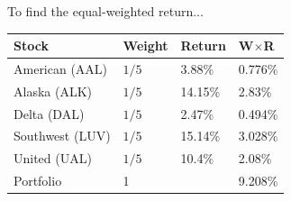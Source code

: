 To find the equal-weighted return...
\begin{center}
	{\color{blue}
	\begin{tabular}{l|lll}
		\textbf{Stock} & \textbf{W}eight & \textbf{R}eturn & \textbf{W}$\times$\textbf{R}\\ \hline
		American (AAL) & $1/5$ & 3.88\% & 0.776\% \\
		Alaska (ALK) & $1/5$ & 14.15\% & 2.83\% \\
		Delta (DAL) & $1/5$ & 2.47\% & 0.494\% \\
		Southwest (LUV) & $1/5$ & 15.14\% & 3.028\% \\
		United (UAL) & $1/5$ & 10.4\% & 2.08\% \\ \hline 
		Portfolio & 1 && 9.208\% \\\hline
	\end{tabular}
	}
\end{center}